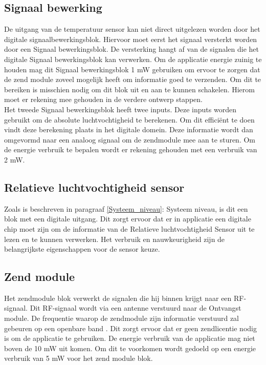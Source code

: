 \subsection{Signaal bewerking}
De uitgang van de temperatuur sensor kan niet direct uitgelezen worden door het digitale signaalbewerkingsblok. Hiervoor moet eerst het signaal versterkt worden door een Signaal bewerkingsblok. De versterking hangt af van de signalen die het digitale Signaal bewerkingsblok kan verwerken. Om de applicatie energie zuinig te houden mag dit Signaal bewerkingsblok 1 mW gebruiken om ervoor te zorgen dat de zend module zoveel mogelijk heeft om informatie goed te verzenden. Om dit te bereiken is misschien nodig om dit blok uit en aan te kunnen schakelen. Hierom moet er rekening mee gehouden in de verdere ontwerp stappen.
\\
\newline
Het tweede Signaal bewerkingsblok heeft twee inputs. Deze inputs worden gebruikt om de absolute luchtvochtigheid te berekenen. Om dit efficiënt te doen vindt deze berekening plaats in het digitale domein. Deze informatie wordt dan omgevormd naar een analoog signaal om de zendmodule mee aan te sturen. Om de energie verbruik te bepalen wordt er rekening gehouden met een verbruik van 2 mW.

\subsection{Relatieve luchtvochtigheid sensor}
Zoals is beschreven in paragraaf \ref{Systeem_niveau}: Systeem niveau, is dit een blok met een digitale uitgang. Dit zorgt ervoor dat er in applicatie een digitale chip moet zijn om de informatie van de Relatieve luchtvochtigheid Sensor uit te lezen en te kunnen verwerken. Het verbruik en nauwkeurigheid zijn de belangrijkste eigenschappen voor de sensor keuze.

\subsection{Zend module}
Het zendmodule blok verwerkt de signalen die hij binnen krijgt naar een RF-signaal. Dit RF-signaal wordt via een antenne verstuurd naar de Ontvangst module. De frequentie waarop de zendmodule zijn informatie verstuurd zal gebeuren op een openbare band \cite{RF_banden}. Dit zorgt ervoor dat er geen zendlicentie nodig is om de applicatie te gebruiken. De energie verbruik van de applicatie mag niet boven de 10 mW uit komen. Om dit te voorkomen wordt gedoeld op een energie verbruik van 5 mW voor het zend module blok.

